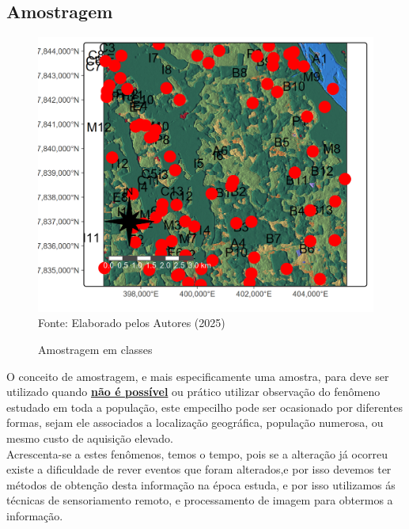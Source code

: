  \subsection*{Amostragem}
            \begin{figure}
 	\begin{center}
 		\centering  \small \caption{Amostragem em classes}
 		\includegraphics[width=0.97\linewidth]{FIGURAS/usoSOLOamostras}
 		\label{fig:usoSOLOamostras}\\{ Fonte:   Elaborado pelos Autores (2025)}
 	\end{center}
 \end{figure} 
  \hspace*{1.25 cm} O conceito de amostragem, e mais especificamente uma amostra, para  \cite[p.~281]{Krishnaswamy} deve ser utilizado quando \textbf{\underline{não é possível}} ou prático utilizar observação do fenômeno estudado em toda a população, este empecilho pode ser ocasionado por diferentes formas, sejam ele associados a localização geográfica, população numerosa, ou mesmo custo de aquisição elevado.\\
  \hspace*{1.25 cm}  Acrescenta-se a estes fenômenos, temos o tempo, pois se a alteração já ocorreu existe a dificuldade de rever eventos que foram alterados,e por isso devemos ter métodos de obtenção desta informação na época estuda, e por isso utilizamos ás técnicas de sensoriamento remoto, e processamento de imagem  para obtermos a informação.\\
